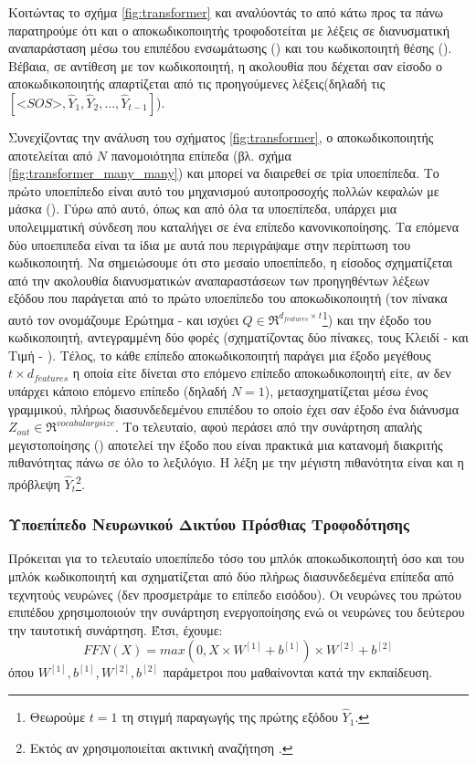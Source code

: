 Κοιτώντας το σχήμα \ref{fig:transformer} και αναλύοντάς το από κάτω προς τα πάνω παρατηρούμε ότι και ο αποκωδικοποιητής τροφοδοτείται με λέξεις σε διανυσματική αναπαράσταση μέσω του επιπέδου ενσωμάτωσης () και του κωδικοποιητή θέσης (). Βέβαια, σε αντίθεση με τον κωδικοποιητή, η ακολουθία που δέχεται σαν είσοδο ο αποκωδικοποιητής απαρτίζεται από τις προηγούμενες λέξεις (δηλαδή τις$[\mathbin{<}SOS\mathbin{>}, \hat{Y}_1, \hat{Y}_2, \dots, \hat{Y}_{t-1}]$).\par

Συνεχίζοντας την ανάλυση του σχήματος \ref{fig:transformer}, ο αποκωδικοποιητής αποτελείται από $N$ πανομοιότηπα επίπεδα (βλ. σχήμα \ref{fig:transformer_many_many}) και μπορεί να διαιρεθεί σε τρία υποεπίπεδα. Το πρώτο υποεπίπεδο είναι αυτό του μηχανισμού αυτο\textendash προσοχής πολλών κεφαλών με μάσκα (). Γύρω από αυτό, όπως και από όλα τα υπο\textendash επίπεδα, υπάρχει μια υπολειμματική σύνδεση που καταλήγει σε ένα επίπεδο κανονικοποίησης. Τα επόμενα δύο υπο\textendash επιπεδα είναι τα ίδια με αυτά που περιγράψαμε στην περίπτωση του κωδικοποιητή. Να σημειώσουμε ότι στο μεσαίο υποεπίπεδο, η είσοδος σχηματίζεται από την ακολουθία διανυσματικών αναπαραστάσεων των προηγηθέντων λέξεων εξόδου που παράγεται από το πρώτο υποεπίπεδο του αποκωδικοποιητή (τον πίνακα αυτό τον ονομάζουμε Ερώτημα -  και ισχύει $Q \in \Re^{d_{features} \times {t}}$\footnote{Θεωρούμε $t=1$ τη στιγμή παραγωγής της πρώτης εξόδου $\hat{Y}_1$.}) και την έξοδο του κωδικοποιητή, αντεγραμμένη δύο φορές (σχηματίζοντας δύο πίνακες, τους Κλειδί -  και Τιμή - ). Τέλος, το κάθε επίπεδο αποκωδικοποιητή παράγει μια έξοδο μεγέθους $t \times d_{features}$ η οποία είτε δίνεται στο επόμενο επίπεδο αποκωδικοποιητή είτε, αν δεν υπάρχει κάποιο επόμενο επίπεδο (δηλαδή $N=1$), μετασχηματίζεται μέσω ένος γραμμικού, πλήρως διασυνδεδεμένου επιπέδου το οποίο έχει σαν έξοδο ένα διάνυσμα $Z_{out} \in \Re^{vocabulary size}$. Το τελευταίο, αφού περάσει από την συνάρτηση απαλής μεγιστοποίησης () αποτελεί την έξοδο που είναι πρακτικά μια κατανομή διακριτής πιθανότητας πάνω σε όλο το λεξιλόγιο. Η λέξη με την μέγιστη πιθανότητα είναι και η πρόβλεψη $\hat{Y}_t$\footnote{Εκτός αν χρησιμοποιείται ακτινική αναζήτηση .}.

\subsubsection{Υποεπίπεδο Νευρωνικού Δικτύου Πρόσθιας Τροφοδότησης}
Πρόκειται για το τελευταίο υποεπίπεδο τόσο του μπλόκ αποκωδικοποιητή όσο και του μπλόκ κωδικοποιητή και σχηματίζεται από δύο πλήρως διασυνδεδεμένα επίπεδα από τεχνητούς νευρώνες (δεν προσμετράμε το επίπεδο εισόδου). Οι νευρώνες του πρώτου επιπέδου χρησιμοποιούν την συνάρτηση ενεργοποίησης  ενώ οι νευρώνες του δεύτερου την ταυτοτική συνάρτηση. Έτσι, έχουμε:
\[
  FFN(X) = max(0, X \times W^{[1]} + b^{[1]})\times W^{[2]} + b^{[2]}
\]όπου $W^{[1]}, b^{[1]}, W^{[2]}, b^{[2]}$ παράμετροι που μαθαίνονται κατά την εκπαίδευση.\par


